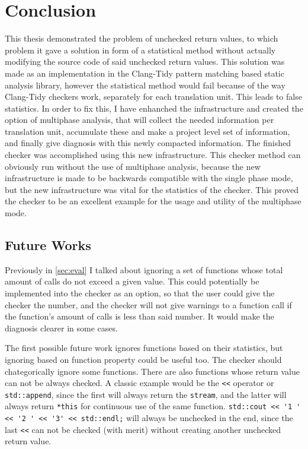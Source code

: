 \chapter{Conclusion}
\label{ch:sum}

This thesis demonstrated the problem of unchecked return values, to which problem it gave a solution in form of a statistical method without
actually modifying the source code of said unchecked return values. This solution was made as an implementation in the Clang-Tidy pattern
matching based static analysis library, however the statistical method would fail because of the way Clang-Tidy checkers work, separately
for each translation unit. This leads to false statistics. In order to fix this, I have enhanched the infrastructure and created the
option of multiphase analysis, that will collect the needed information per translation unit, accumulate these and make a project level set
of information, and finally give diagnosis with this newly compacted information. The finished checker was accomplished using this new
infrastructure. This checker method can obviously run without the use of multiphase analysis, because the new infrastructure is made to be
backwards compatible with the single phase mode, but the new infrastructure was vital for the statistics of the checker. This proved the
checker to be an excellent example for the usage and utility of the multiphase mode.

\section{Future Works}

Previously in \cref{sec:eval} I talked about ignoring a set of functions whose total amount of calls do not exceed a given value. This could
potentially be implemented into the checker as an option, so that the user could give the checker the number, and the checker will not give
warnings to a function call if the function's amount of calls is less than said number. It would make the diagnosis clearer in some cases.

The first possible future work ignores functions based on their statistics, but ignoring based on function property could be useful too.
The checker should chategorically ignore some functions. There are also functions whose return value can not be always checked. A classic
example would be the \lstinline{<<} operator or \lstinline{std::append}, since the first will always return the \texttt{stream}, and the latter
will always return \lstinline{*this} for continuous use of the same function. \lstinline{std::cout << '1 ' << '2 ' << '3' << std::endl;} will
always be unchecked in the end, since the last \lstinline{<<} can not be checked (with merit) without creating another unchecked return value.

